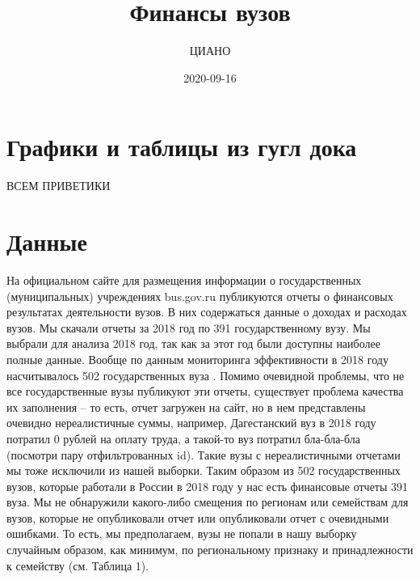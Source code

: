 \documentclass[]{book}
\title{Финансы вузов}
\author{ЦИАНО}
\date{2020-09-16}
\begin{document}
\maketitle

{
\setcounter{tocdepth}{1}
\tableofcontents
}
\hypertarget{ux433ux440ux430ux444ux438ux43aux438-ux438-ux442ux430ux431ux43bux438ux446ux44b-ux438ux437-ux433ux443ux433ux43b-ux434ux43eux43aux430}{%
\chapter*{Графики и таблицы из гугл дока}\label{ux433ux440ux430ux444ux438ux43aux438-ux438-ux442ux430ux431ux43bux438ux446ux44b-ux438ux437-ux433ux443ux433ux43b-ux434ux43eux43aux430}}

ВСЕМ ПРИВЕТИКИ

\hypertarget{ux434ux430ux43dux43dux44bux435}{%
\chapter{Данные}\label{ux434ux430ux43dux43dux44bux435}}

На официальном сайте для размещения информации о государственных (муниципальных) учреждениях bus.gov.ru публикуются отчеты о финансовых результатах деятельности вузов. В них содержаться данные о доходах и расходах вузов. Мы скачали отчеты за 2018 год по 391 государственному вузу. Мы выбрали для анализа 2018 год, так как за этот год были доступны наиболее полные данные. Вообще по данным мониторинга эффективности в 2018 году насчитывалось 502 государственных вуза . Помимо очевидной проблемы, что не все государственные вузы публикуют эти отчеты, существует проблема качества их заполнения -- то есть, отчет загружен на сайт, но в нем представлены очевидно нереалистичные суммы, например, Дагестанский вуз в 2018 году потратил 0 рублей на оплату труда, а такой-то вуз потратил бла-бла-бла (посмотри пару отфильтрованных id). Такие вузы с нереалистичными отчетами мы тоже исключили из нашей выборки. Таким образом из 502 государственных вузов, которые работали в России в 2018 году у нас есть финансовые отчеты 391 вуза. Мы не обнаружили какого-либо смещения по регионам или семействам для вузов, которые не опубликовали отчет или опубликовали отчет с очевидными ошибками. То есть, мы предполагаем, вузы не попали в нашу выборку случайным образом, как минимум, по региональному признаку и принадлежности к семейству (см. Таблица 1).
\end{document}
